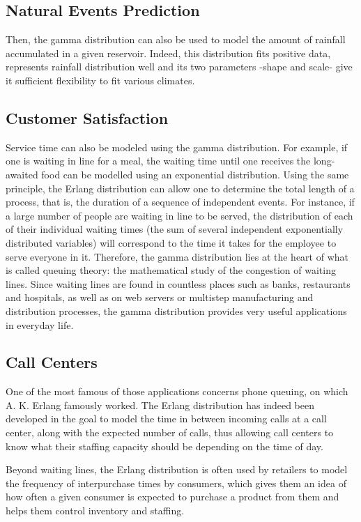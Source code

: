\documentclass[12pt]{article}
\begin{document}
\subsection{Natural Events Prediction}
Then, the gamma distribution can also be used to model the amount of rainfall accumulated in a given reservoir. Indeed,
this distribution fits positive data, represents rainfall distribution well and its two parameters -shape and scale-
give it sufficient flexibility to fit various climates\cite{husakUseGammaDistribution2007a}.

\subsection{Customer Satisfaction}
Service time can also be modeled using the gamma distribution. For example, if one is waiting in line for a meal, the
waiting time until one receives the long-awaited food can be modelled using an exponential distribution. Using the same
principle, the Erlang distribution can allow one to determine the total length of a process, that is, the duration of a
sequence of independent events. For instance, if a large number of people are waiting in line to be served, the
distribution of each of their individual waiting times (the sum of several independent exponentially distributed
variables) will correspond to the time it takes for the employee to serve everyone in it. Therefore, the gamma
distribution lies at the heart of what is called queuing theory: the mathematical study of the congestion of waiting
lines. Since waiting lines are found in countless places such as banks, restaurants and hospitals, as well as on web
servers or multistep manufacturing and distribution processes, the gamma distribution provides very useful applications
in everyday life.

\subsection{Call Centers}
One of the most famous of those applications concerns phone queuing, on which A. K. Erlang famously worked. The Erlang
distribution has indeed been developed in the goal to model the time in between incoming calls at a call center, along
with the expected number of calls, thus allowing call centers to know what their staffing capacity should be depending
on the time of day.

Beyond waiting lines, the Erlang distribution is often used by retailers to model the frequency of interpurchase times
by consumers, which gives them an idea of how often a given consumer is expected to purchase a product from them and
helps them control inventory and staffing.
\end{document}
